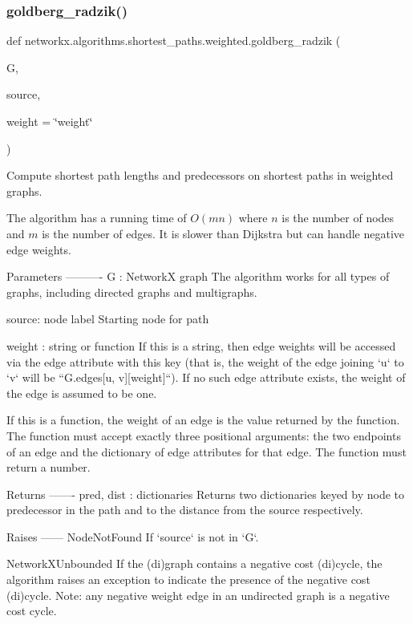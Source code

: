 \subsubsection{\texorpdfstring{goldberg\+\_\+radzik()}{goldberg\_radzik()}}
{\footnotesize\ttfamily def networkx.\+algorithms.\+shortest\+\_\+paths.\+weighted.\+goldberg\+\_\+radzik (\begin{DoxyParamCaption}\item[{}]{G,  }\item[{}]{source,  }\item[{}]{weight = {\ttfamily \char`\"{}weight\char`\"{}} }\end{DoxyParamCaption})}

\begin{DoxyVerb}Compute shortest path lengths and predecessors on shortest paths
in weighted graphs.

The algorithm has a running time of $O(mn)$ where $n$ is the number of
nodes and $m$ is the number of edges.  It is slower than Dijkstra but
can handle negative edge weights.

Parameters
----------
G : NetworkX graph
    The algorithm works for all types of graphs, including directed
    graphs and multigraphs.

source: node label
    Starting node for path

weight : string or function
    If this is a string, then edge weights will be accessed via the
    edge attribute with this key (that is, the weight of the edge
    joining `u` to `v` will be ``G.edges[u, v][weight]``). If no
    such edge attribute exists, the weight of the edge is assumed to
    be one.

    If this is a function, the weight of an edge is the value
    returned by the function. The function must accept exactly three
    positional arguments: the two endpoints of an edge and the
    dictionary of edge attributes for that edge. The function must
    return a number.

Returns
-------
pred, dist : dictionaries
    Returns two dictionaries keyed by node to predecessor in the
    path and to the distance from the source respectively.

Raises
------
NodeNotFound
    If `source` is not in `G`.

NetworkXUnbounded
    If the (di)graph contains a negative cost (di)cycle, the
    algorithm raises an exception to indicate the presence of the
    negative cost (di)cycle.  Note: any negative weight edge in an
    undirected graph is a negative cost cycle.


\end{DoxyVerb}
